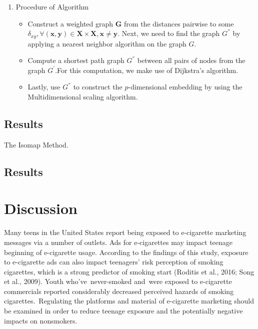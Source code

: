 \documentclass[12pt]{article}
\begin{document}
\begin{enumerate}
    \item Procedure of Algorithm
    \begin{itemize}
        \item Construct a weighted graph \textbf{G} from the distances pairwise to some \newline$\delta_{xy},\forall (\textbf{x},\textbf{y})\in \textbf{X} \times \textbf{X},\textbf{x}\neq\textbf{y}.$ Next, we need to find the graph $G^{''}$ by applying a nearest neighbor algorithm on the graph $G$.
        \item Compute a shortest path graph $G^{''}$ between all pairs of nodes from the graph $G^'$.\newline For this computation, we make use of Dijkstra’s algorithm.
        \item Lastly, use $G^{''}$ to construct the $p$-dimensional embedding by using the Multidimensional scaling algorithm.
    \end{itemize}
\end{enumerate}

\hspace{5mm}

\subsection{Results}


\hspace{5mm}The Isomap Method.

\subsection{Results}

\newpage

\section{Discussion} \label{sec:discussion}

\hspace{5mm}Many teens in the United States report being exposed to e-cigarette marketing messages via a number of outlets. Ads for e-cigarettes may impact teenage beginning of e-cigarette usage. According to the findings of this study, exposure to e-cigarette ads can also impact teenagers' risk perception of smoking cigarettes, which is a strong predictor of smoking start (Roditis et al., 2016; Song et al., 2009). Youth who've never-smoked and were exposed to e-cigarette commercials reported considerably decreased perceived hazards of smoking cigarettes. Regulating the platforms and material of e-cigarette marketing should be examined in order to reduce teenage exposure and the potentially negative impacts on nonsmokers. 
\end{document}
